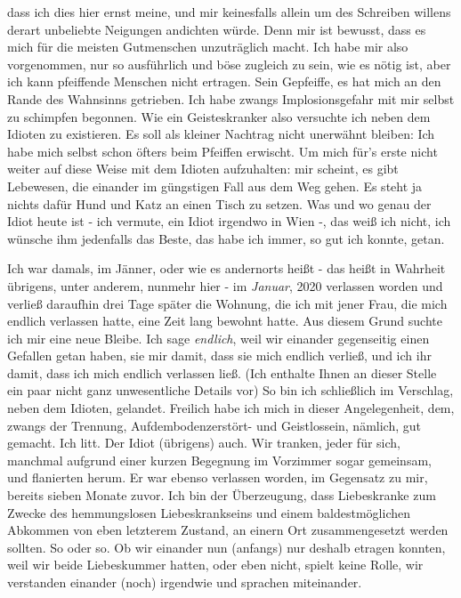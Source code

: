 \documentclass{scrbook}
\begin{document}
 dass ich dies hier ernst
meine, und mir keinesfalls allein um des Schreiben
 willens derart unbeliebte
Neigungen andichten würde. Denn mir ist bewusst,
 dass es mich für die meisten
Gutmenschen unzuträglich macht. Ich habe mir
 also vorgenommen, nur so
ausführlich und böse zugleich zu sein, wie es nötig
 ist, aber ich kann
pfeiffende Menschen nicht ertragen. Sein Gepfeiffe, es hat
 mich an den Rande
des Wahnsinns getrieben. Ich habe zwangs Implosionsgefahr
 mit mir selbst zu
schimpfen begonnen. Wie ein Geisteskranker also versuchte
 ich neben dem Idioten
zu existieren. Es soll als kleiner Nachtrag nicht
 unerwähnt bleiben: Ich habe
mich selbst schon öfters beim Pfeiffen erwischt.
 Um mich für's erste nicht
weiter auf diese Weise mit dem Idioten aufzuhalten:
 mir scheint, es gibt
Lebewesen, die einander im güngstigen Fall aus dem Weg
 gehen. Es steht ja
nichts dafür Hund und Katz an einen Tisch zu setzen. Was
 und wo genau der Idiot
heute ist - ich vermute, ein Idiot irgendwo in Wien -,
 das weiß ich nicht, ich
wünsche ihm jedenfalls das Beste, das habe ich immer,
 so gut ich konnte, getan.

Ich war damals, im Jänner, oder wie es andernorts heißt - das heißt in Wahrheit
übrigens, unter anderem, nunmehr hier - im \emph{Januar}, 2020
 verlassen
worden und verließ daraufhin drei Tage später die Wohnung, die ich
 mit jener
Frau, die mich endlich verlassen hatte, eine Zeit lang bewohnt
 hatte. Aus
diesem Grund suchte ich mir eine neue Bleibe. Ich sage
 \textit{endlich}, weil
wir einander gegenseitig einen Gefallen getan haben,
 sie mir damit, dass sie
mich endlich verließ, und ich ihr damit, dass ich
 mich endlich verlassen ließ.
(Ich enthalte Ihnen an dieser Stelle ein paar
 nicht ganz unwesentliche Details
vor) So bin ich schließlich im Verschlag,
 neben dem Idioten, gelandet.
Freilich
 habe ich mich in dieser Angelegenheit,
 dem, zwangs der Trennung,
Aufdembodenzerstört- und Geistlossein,
 nämlich, gut gemacht. Ich litt. Der
Idiot (übrigens) auch. Wir tranken, jeder für sich,
 manchmal aufgrund einer
kurzen Begegnung im Vorzimmer sogar gemeinsam,
 und flanierten herum.  Er war
ebenso verlassen
 worden, im Gegensatz zu mir,
 bereits sieben Monate zuvor. Ich
bin der
 Überzeugung, dass Liebeskranke zum
 Zwecke des hemmungslosen
Liebeskrankseins 
 und einem baldestmöglichen Abkommen
 von eben letzterem
Zustand, an einern Ort 
 zusammengesetzt werden sollten. So
 oder so. Ob wir
einander nun (anfangs) nur deshalb etragen konnten, weil wir
 beide Liebeskummer
hatten, oder eben nicht, spielt keine Rolle, wir
 verstanden
 einander (noch)
irgendwie und sprachen miteinander. 




\end{document}
